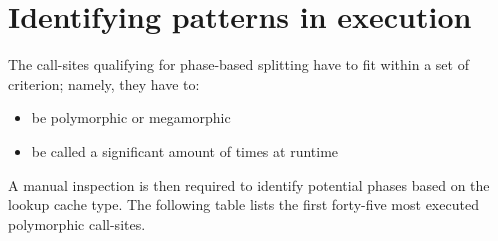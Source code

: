 \documentclass[preprint]{acmart}
\begin{document}
\section{Identifying patterns in execution}

The call-sites qualifying for phase-based splitting have to fit within a set of criterion; namely, they have to:
 \begin{itemize}
 \item be polymorphic or megamorphic
 \item be called a significant amount of times at runtime
 \end{itemize}

A manual inspection is then required to identify potential phases based on the lookup cache type. The following table lists the first forty-five most executed polymorphic call-sites.

\begin{landscape}

\SuperHottestMegamorphic{}

\end{landscape}

\appendix



\end{document}
